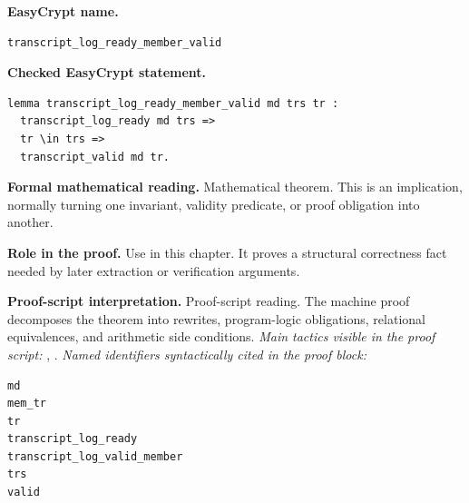 \begin{formaltheorem}
\noindent\textbf{EasyCrypt name.}
\begin{lstlisting}[language=EasyCrypt,basicstyle=\ttfamily\scriptsize]
transcript_log_ready_member_valid
\end{lstlisting}
\noindent\textbf{Checked EasyCrypt statement.}
\begin{lstlisting}[language=EasyCrypt,basicstyle=\ttfamily\scriptsize]
lemma transcript_log_ready_member_valid md trs tr :
  transcript_log_ready md trs =>
  tr \in trs =>
  transcript_valid md tr.
\end{lstlisting}
\noindent\textbf{Formal mathematical reading.}
Mathematical theorem. This is an implication, normally turning one invariant, validity predicate, or proof obligation into another.

\noindent\textbf{Role in the proof.}
Use in this chapter. It proves a structural correctness fact needed by later extraction or verification arguments.

\noindent\textbf{Proof-script interpretation.}
Proof-script reading. The machine proof decomposes the theorem into rewrites, program-logic obligations, relational equivalences, and arithmetic side conditions.
\emph{Main tactics visible in the proof script:} , .
\emph{Named identifiers syntactically cited in the proof block:}
\begin{lstlisting}[language=EasyCrypt,basicstyle=\ttfamily\scriptsize]
md
mem_tr
tr
transcript_log_ready
transcript_log_valid_member
trs
valid
\end{lstlisting}

\end{formaltheorem}

